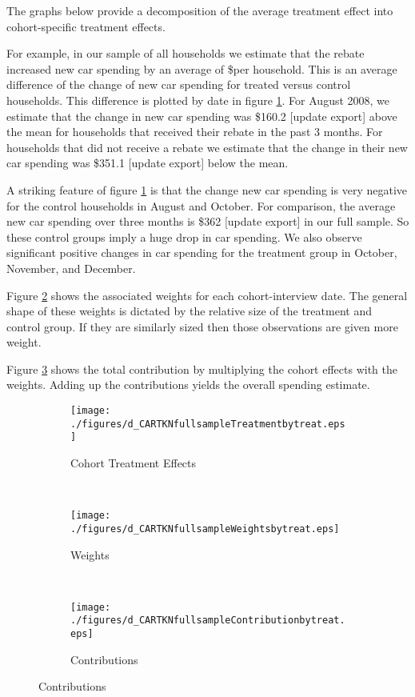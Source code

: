 The graphs below provide a decomposition of the average treatment effect
into cohort-specific treatment effects.

For example, in our sample of all households we estimate that the rebate
increased new car spending by an average of \$\scalardCARTKNfullsampletext per household. This is
an average difference of the change of new car spending for treated versus
control households. This difference is plotted by date in figure \ref{fig:fullsampled_CARTKNTreatmentbytreat}.
For August 2008, we estimate that the change in new car spending was \$160.2 [update export]
above the mean for households that received their rebate in the past 3
months. For households that did not receive a rebate we estimate that the change
in their new car spending was \$351.1 [update export] below the mean.

A striking feature of figure \ref{fig:fullsampled_CARTKNTreatmentbytreat} is that the change new car spending is 
very negative for the control households in August and October. For comparison,
the average new car spending over three months is \$362 [update export] in our full sample. So these
control groups imply a huge drop in car spending. We also observe significant
positive changes in car spending for the treatment group in October, November,
and December.

Figure \ref{fig:fullsampled_CARTKNWeightsbytreat} shows the associated weights for each cohort-interview date. The
general shape of these weights is dictated by the relative size of the
treatment and control group. If they are similarly sized then those observations
are given more weight.

Figure \ref{fig:fullsampled_CARTKNContributionbytreat} shows the total contribution by multiplying the cohort effects 
with the weights. Adding up the contributions yields the overall spending
estimate.

\begin{figure}
    \caption{Change in New Car Spending: Full Sample} 
    \begin{subfigure}[t]{\linewidth}
        \centering\texttt{[image: ./figures/d\_CARTKNfullsampleTreatmentbytreat.eps]}
        \caption{Cohort Treatment Effects}
        \label{fig:fullsampled_CARTKNTreatmentbytreat}
      \end{subfigure}\\
      \begin{subfigure}[t]{\linewidth}
        \centering\texttt{[image: ./figures/d\_CARTKNfullsampleWeightsbytreat.eps]}
        \caption{Weights}
        \label{fig:fullsampled_CARTKNWeightsbytreat}
      \end{subfigure}\\
      \begin{subfigure}[t]{\linewidth}
        \centering\texttt{[image: ./figures/d\_CARTKNfullsampleContributionbytreat.eps]}
        \caption{Contributions}
        \label{fig:fullsampled_CARTKNContributionbytreat}
      \end{subfigure}
      \label{fig:fullsampled_CARTKN}
\end{figure}    


